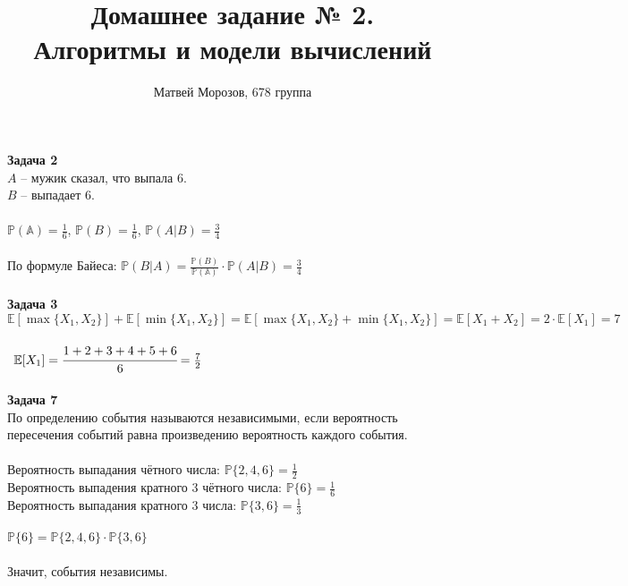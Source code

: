 \documentclass[11pt]{article}
\begin{document}
	\author{Матвей Морозов, 678 группа}
	\title{Домашнее задание № 2.\\ Алгоритмы и модели вычислений}
	\maketitle
	
	\textbf{Задача 2}
	\\
	$A$ -- мужик сказал, что выпала $6$.\\
	$B$ -- выпадает $6$.\\\\
	$\mathbb{P(A)} = \frac{1}{6}$, $\mathbb{P}(B) = \frac{1}{6}$, $\mathbb{P}(A|B) = \frac{3}{4}$
	\\\\
	По формуле Байеса: $\mathbb{P}(B|A) = \frac {\mathbb{P}(B)}{\mathbb{P(A)}}\cdot \mathbb{P}(A|B) = \frac{3}{4}$
	\\
	\\
	
	\textbf{Задача 3}
	\\
	$\mathbb{E}[\max\{X_1,X_2\}] + \mathbb{E}[\min\{X_1,X_2\}] = \mathbb{E}[\max\{X_1,X_2\} + \min\{X_1,X_2\}] = \mathbb{E}[X_1+X_2] =2 \cdot \mathbb{E}[X_1] = 7$
	\\\\\
	$\mathbb{E}[X_1] = \cfrac{1+2+3+4+5+6}{6} = \frac{7}{2}$
	\\
	\\
	
	\textbf{Задача 7}
	\\
	По определению события называются независимыми, если вероятность пересечения событий равна произведению вероятность каждого события.
	\\
	\\
	Вероятность выпадания чётного числа: $\mathbb{P}\{2,4,6\} = \frac{1}{2}$\\
	Вероятность выпадения кратного $3$ чётного числа: $\mathbb{P}\{6\} = \frac{1}{6}$\\
	Вероятность выпадания кратного $3$ числа: $\mathbb{P}\{3,6\} = \frac{1}{3}$\\
	\\
	$\mathbb{P}\{6\} = \mathbb{P}\{2,4,6\} \cdot \mathbb{P}\{3,6\}$\\
	\\
	Значит, события независимы.
	\newpage
	
\end{document}
